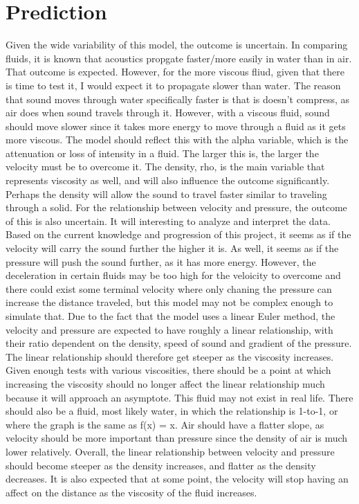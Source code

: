 \documentclass{article}
\begin{document}
\newpage

\section{Prediction}

Given the wide variability of this model, the outcome is uncertain. In comparing fluids, it is known
that acoustics propgate faster/more easily in water than in air. That outcome is expected. However, for the
more viscous fliud, given that there is time to test it, I would expect it to propagate slower than water.
The reason that sound moves through water specifically faster is that is doesn't compress, as air does
when sound travels through it. However, with a viscous fluid, sound should move slower since it takes
more energy to move through a fluid as it gets more viscous. The model should reflect this with the 
alpha variable, which is the attenuation or loss of intensity in a fluid. The larger this is, the
larger the velocity must be to overcome it. The density, rho, is the main variable that represents
viscosity as well, and will also influence the outcome significantly. Perhaps the density will allow
the sound to travel faster similar to traveling through a solid. 
For the relationship between velocity and pressure, the outcome of this is also uncertain. It will
interesting to analyze and interpret the data. Based on the current knowledge and progression of this
project, it seems as if the velocity will carry the sound further the higher it is. As well, it 
seems as if the pressure will push the sound further, as it has more energy. However, the deceleration in
certain fluids may be too high for the veloicity to overcome and there could exist some terminal velocity
where only chaning the pressure can increase the distance traveled, but this model may not be complex enough
to simulate that. 
Due to the fact that the model uses a linear Euler method, the velocity and pressure are expected to have
roughly a linear relationship, with their ratio dependent on the density, speed of sound and gradient
of the pressure. The linear relationship should therefore get steeper as the viscosity increases. 
Given enough tests with various viscosities, there should be a point at which increasing the viscosity
should no longer affect the linear relationship much because it will approach an asymptote. This fluid
may not exist in real life. There should also be a fluid, most likely water, in which the relationship
is 1-to-1, or where the graph is the same as f(x) = x. Air should have a flatter slope, as velocity
should be more important than pressure since the density of air is much lower relatively. 
Overall, the linear relationship between velocity and pressure should become steeper as the density
increases, and flatter as the density decreases. It is also expected that at some point, the velocity
will stop having an affect on the distance as the viscosity of the fluid increases.
\end{document}
